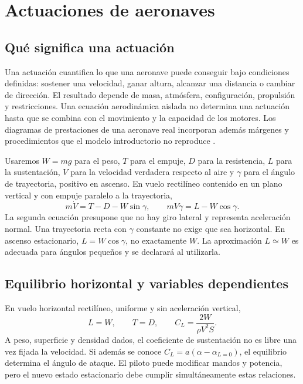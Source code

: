 \chapter{Actuaciones de aeronaves}\label{ch:11}

\section{Qué significa una actuación}
Una actuación cuantifica lo que una aeronave puede conseguir bajo condiciones definidas: sostener una velocidad, ganar altura, alcanzar una distancia o cambiar de dirección. El resultado depende de masa, atmósfera, configuración, propulsión y restricciones. Una ecuación aerodinámica aislada no determina una actuación hasta que se combina con el movimiento y la capacidad de los motores. Los diagramas de prestaciones de una aeronave real incorporan además márgenes y procedimientos que el modelo introductorio no reproduce \cite{PHAK}.

Usaremos $W=mg$ para el peso, $T$ para el empuje, $D$ para la resistencia, $L$ para la sustentación, $V$ para la velocidad verdadera respecto al aire y $\gamma$ para el ángulo de trayectoria, positivo en ascenso. En vuelo rectilíneo contenido en un plano vertical y con empuje paralelo a la trayectoria,
\begin{equation}\label{eq:11-forces}
m\dot V=T-D-W\sin\gamma,\qquad
mV\dot\gamma=L-W\cos\gamma.
\end{equation}
La segunda ecuación presupone que no hay giro lateral y representa aceleración normal. Una trayectoria recta con $\gamma$ constante no exige que sea horizontal. En ascenso estacionario, $L=W\cos\gamma$, no exactamente $W$. La aproximación $L\simeq W$ es adecuada para ángulos pequeños y se declarará al utilizarla.


\section{Equilibrio horizontal y variables dependientes}
En vuelo horizontal rectilíneo, uniforme y sin aceleración vertical,
\begin{equation}\label{eq:11-level}
L=W,\qquad T=D,\qquad C_L=\frac{2W}{\rho V^2S}.
\end{equation}
A peso, superficie y densidad dados, el coeficiente de sustentación no es libre una vez fijada la velocidad. Si además se conoce $C_L=a(\alpha-\alpha_{L=0})$, el equilibrio determina el ángulo de ataque. El piloto puede modificar mandos y potencia, pero el nuevo estado estacionario debe cumplir simultáneamente estas relaciones.

